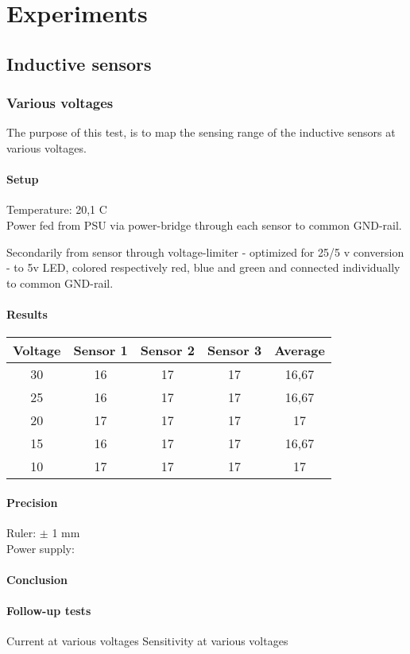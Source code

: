 \chapter{Experiments}

\section{Inductive sensors}

\subsection{Various voltages}
The purpose of this test, is to map the sensing range of the inductive sensors at various voltages.

\subsubsection{Setup}
Temperature: 20,1 \textdegree C\\
Power fed from PSU via power-bridge through each sensor to common GND-rail.

Secondarily from sensor through voltage-limiter - optimized for 25/5 v conversion - to 5v LED, colored respectively red, blue and green and connected individually to common GND-rail.

\subsubsection{Results}

\begin{center}
\begin{tabular}{|c|c|c|c|c|}
\hline
    \rowcolor{gray!25}
    Voltage & Sensor 1 & Sensor 2 & Sensor 3 & Average
\\
\hline
    30 & 16 & 17 & 17 & 16,67
\\
\hline
    \rowcolor{gray!25}
    25 & 16 & 17 & 17 & 16,67
\\
\hline
    20 & 17 & 17 & 17 & 17
\\
\hline 
    \rowcolor{gray!25}
    15 & 16 & 17 & 17 & 16,67
\\
\hline
    10 & 17 & 17 & 17 & 17
\\
\hline
\end{tabular}
\end{center}

\subsubsection{Precision}
Ruler: $ \pm $ 1 mm\\
Power supply:

\subsubsection{Conclusion}


\subsubsection{Follow-up tests}

Current at various voltages
Sensitivity at various voltages